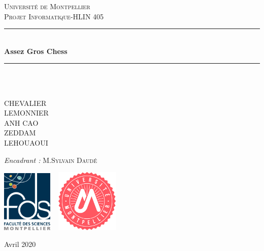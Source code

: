 \documentclass[12pt, openany]{report}
\newcommand{\HRule}{\rule{\linewidth}{0.5mm}}
\begin{document}
\begin{titlepage}
  \begin{sffamily}
  \begin{center}

  
   

    \textsc{\LARGE Université de Montpellier}\\[2cm]

    \textsc{\Large Projet Informatique-HLIN 405}\\[1.5cm]

    \HRule \\[0.4cm]
    { \huge \bfseries Assez Gros Chess\\[0.4cm] }

    \HRule \\[2cm]
    
    \\[2cm]

    \begin{minipage}{0.4\textwidth}
      \begin{flushleft} \large
        CHEVALIER\\
        LEMONNIER\\
        ANH CAO\\
        ZEDDAM\\
        LEHOUAOUI\\
       
      \end{flushleft}
    \end{minipage}
    \begin{minipage}{0.4\textwidth}
      \begin{flushright} \large
         \emph{Encadrant :} M.\textsc{Sylvain Daudé}\\
      \end{flushright}
    \end{minipage}
     \vfill
     
\includegraphics[width=2.4cm]{fds.png}
\hspace*{0.2cm}~%
\includegraphics[width=3cm]{um.png}

    \vfill

    {\large   Avril 2020}

  \end{center}
  \end{sffamily}
\end{titlepage}
\end{document}
